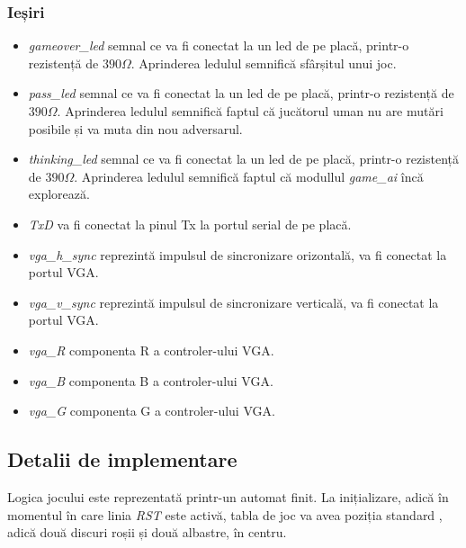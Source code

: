 \documentclass[12pt,twoside,a4paper,fleqn]{book}
\theoremstyle{definition}
\begin{document}
\subsubsection{Ieșiri}
\begin{itemize}
\item \emph{gameover\_led} semnal ce va fi conectat la un led de pe placă, printr-o rezistență de $390\Omega$. Aprinderea ledulul semnifică sfârșitul unui joc. 

\item \emph{pass\_led} semnal ce va fi conectat la un led de pe placă, printr-o rezistență de $390\Omega$. Aprinderea ledulul semnifică faptul că jucătorul uman nu are mutări posibile și va muta din nou adversarul.

\item \emph{thinking\_led} semnal ce va fi conectat la un led de pe placă, printr-o rezistență de $390\Omega$. Aprinderea ledulul semnifică faptul că modullul \emph{game\_ai} încă explorează.

\item \emph{TxD} va fi conectat la pinul Tx la portul serial de pe placă.

\item \emph{vga\_h\_sync} reprezintă impulsul de sincronizare orizontală, va fi conectat la portul VGA.
\item \emph{vga\_v\_sync} reprezintă impulsul de sincronizare verticală, va fi conectat la portul VGA.

\item \emph{vga\_R} componenta R a controler-ului VGA.
\item \emph{vga\_B} componenta B a controler-ului VGA.
\item \emph{vga\_G} componenta G a controler-ului VGA.

\end{itemize}

\subsection{Detalii de implementare}

Logica jocului este reprezentată printr-un automat finit. La inițializare, adică în momentul în care linia \emph{RST} este activă, tabla de joc va avea poziția standard \cite{othello_fang}, adică două discuri roșii și două albastre, în centru.
\end{document}

